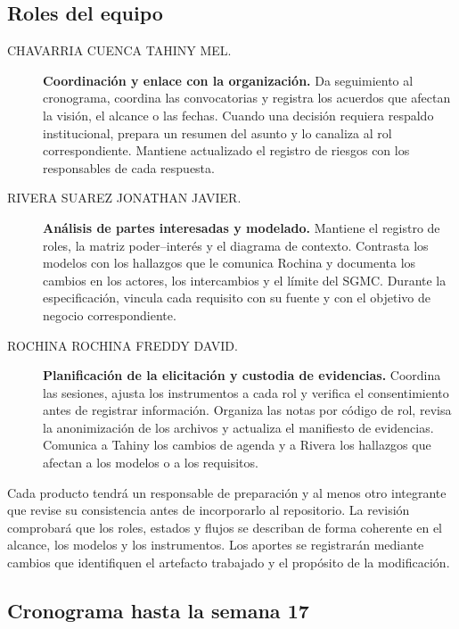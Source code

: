 \documentclass[11pt,a4paper]{article}
\begin{document}
\subsection{Roles del equipo}

\begin{description}
  \item[CHAVARRIA CUENCA TAHINY MEL.]
  \textbf{Coordinación y enlace con la organización.}
  Da seguimiento al cronograma, coordina las convocatorias y registra
  los acuerdos que afectan la visión, el alcance o las fechas. Cuando
  una decisión requiera respaldo institucional, prepara un resumen
  del asunto y lo canaliza al rol correspondiente. Mantiene actualizado
  el registro de riesgos con los responsables de cada respuesta.

    \item[RIVERA SUAREZ JONATHAN JAVIER.]
  \textbf{Análisis de partes interesadas y modelado.}
  Mantiene el registro de roles, la matriz poder--interés y el
  diagrama de contexto. Contrasta los modelos con los hallazgos
  que le comunica Rochina y documenta los cambios en los actores,
  los intercambios y el límite del SGMC. Durante la especificación,
  vincula cada requisito con su fuente y con el objetivo de negocio
  correspondiente.

  \item[ROCHINA ROCHINA FREDDY DAVID.]
  \textbf{Planificación de la elicitación y custodia de evidencias.}
  Coordina las sesiones, ajusta los instrumentos a cada rol y
  verifica el consentimiento antes de registrar información.
  Organiza las notas por código de rol, revisa la anonimización
  de los archivos y actualiza el manifiesto de evidencias.
  Comunica a Tahiny los cambios de agenda y a Rivera los hallazgos
  que afectan a los modelos o a los requisitos.
\end{description}

Cada producto tendrá un responsable de preparación y al menos otro
integrante que revise su consistencia antes de incorporarlo al
repositorio. La revisión comprobará que los roles, estados y flujos
se describan de forma coherente en el alcance, los modelos y los
instrumentos. Los aportes se registrarán mediante cambios que
identifiquen el artefacto trabajado y el propósito de la modificación.


\subsection{Cronograma hasta la semana 17}
\end{document}
